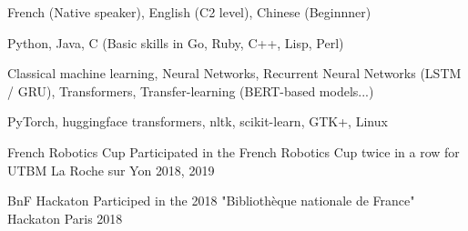 \documentclass[11pt, a4paper]{awesome-cv}
\begin{document}

\begin{cvskills}
  {French (Native speaker), English (C2 level), Chinese (Beginnner)}
  
  {Python, Java, C (Basic skills in Go, Ruby, C++, Lisp, Perl)}

  {Classical machine learning, Neural Networks, Recurrent Neural Networks (LSTM / GRU), Transformers, Transfer-learning (BERT-based models...)}

  {PyTorch, huggingface transformers, nltk, scikit-learn, GTK+, Linux}
\end{cvskills}



\begin{cvhonors}
  \cvhonor
  {French Robotics Cup}
  {Participated in the French Robotics Cup twice in a row for UTBM}
  {La Roche sur Yon}
  {2018, 2019}

  \cvhonor
  {BnF Hackaton}
  {Participed in the 2018 "Bibliothèque nationale de France" Hackaton}
  {Paris}
  {2018}
\end{cvhonors}


\end{document}

